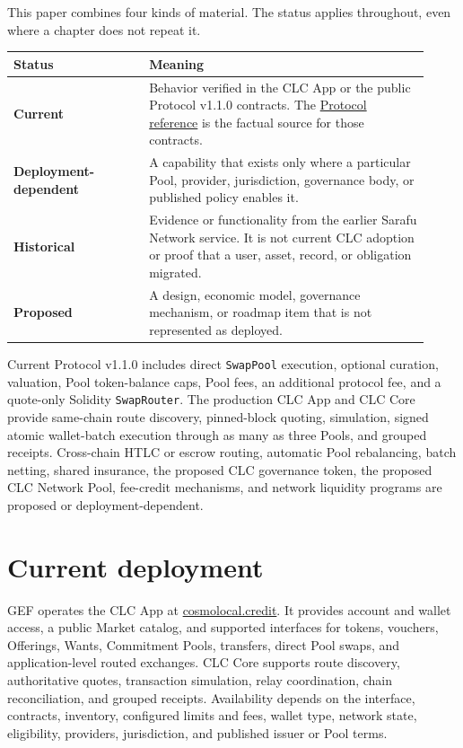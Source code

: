 \documentclass[11pt]{article}
\begin{document}
This paper combines four kinds of material. The status applies throughout, even where a chapter does not repeat it.

\begin{longtable}{P{0.30\linewidth} P{0.62\linewidth}}
\toprule
Status & Meaning \\
\midrule
\endhead
\textbf{Current} & Behavior verified in the CLC App or the public Protocol v1.1.0 contracts. The \href{https://docs.cosmolocal.credit/protocol/overview}{Protocol reference} is the factual source for those contracts. \\
\textbf{Deployment-dependent} & A capability that exists only where a particular Pool, provider, jurisdiction, governance body, or published policy enables it. \\
\textbf{Historical} & Evidence or functionality from the earlier Sarafu Network service. It is not current CLC adoption or proof that a user, asset, record, or obligation migrated. \\
\textbf{Proposed} & A design, economic model, governance mechanism, or roadmap item that is not represented as deployed. \\
\bottomrule
\end{longtable}

Current Protocol v1.1.0 includes direct \texttt{SwapPool} execution, optional curation, valuation, Pool token-balance caps, Pool fees, an additional protocol fee, and a quote-only Solidity \texttt{SwapRouter}. The production CLC App and CLC Core provide same-chain route discovery, pinned-block quoting, simulation, signed atomic wallet-batch execution through as many as three Pools, and grouped receipts. Cross-chain HTLC or escrow routing, automatic Pool rebalancing, batch netting, shared insurance, the proposed CLC governance token, the proposed CLC Network Pool, fee-credit mechanisms, and network liquidity programs are proposed or deployment-dependent.

\section*{Current deployment}

GEF operates the CLC App at \href{https://cosmolocal.credit}{cosmolocal.credit}. It provides account and wallet access, a public Market catalog, and supported interfaces for tokens, vouchers, Offerings, Wants, Commitment Pools, transfers, direct Pool swaps, and application-level routed exchanges. CLC Core supports route discovery, authoritative quotes, transaction simulation, relay coordination, chain reconciliation, and grouped receipts. Availability depends on the interface, contracts, inventory, configured limits and fees, wallet type, network state, eligibility, providers, jurisdiction, and published issuer or Pool terms.
\end{document}
